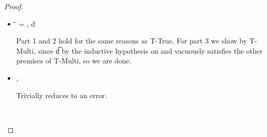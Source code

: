 \begin{lemma}
\begin{proof}
\begin{case}[T-DefMulti]
\begin{itemize}
  \item[]
\begin{subcase}[B-DefMulti]
  \v{} = { {\emptydisptable}},
  \opsem {\openv{}} {} {\v{d}}


Part 1 and 2 hold for the same reasons as T-True.
For part 3 we show 
by T-Multi, since \judgementtwo {} { {\t{d}}} by the inductive hypothesis on {}
and {\emptydisptable} vacuously satisfies the other premises of T-Multi, so we are done.

\end{subcase}
  \item[]
\begin{subcase}[BE-DefMulti] \opsem {\openv{}} {} {\errorvalv{}},
        \opsem {\openv{}} {\e{}} {\errorvalv{}}

        Trivially reduces to an error.

\end{subcase}
\end{itemize}
\end{case}

\begin{case}[T-DefMethod]
        \ 


\end{case}
\end{proof}
\end{lemma}
